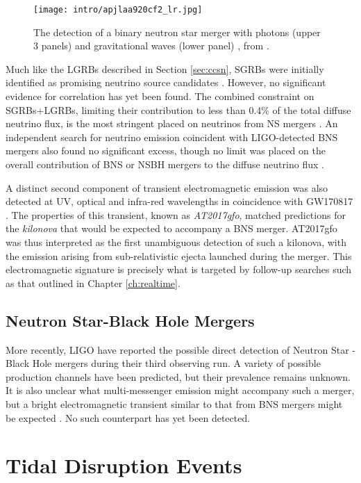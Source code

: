 \begin{figure}[!ht]
	\centering \texttt{[image: intro/apjlaa920cf2\_lr.jpg]}
	\caption{The detection of a binary neutron star merger with photons (upper 3 panels) and gravitational waves (lower panel) , from \cite{grb170817}.}
	\label{fig:gw170817}
\end{figure}

Much like the LGRBs described in Section \ref{sec:ccsn}, SGRBs were initially identified as promising neutrino source candidates \cite{waxman_bahcall_97_grb}. However, no significant evidence for correlation has yet been found. The combined constraint on SGRBs+LGRBs, limiting their contribution to less than 0.4\% of the total diffuse neutrino flux, is the most stringent placed on neutrinos from NS mergers \cite{ic_grb_17}. An independent search for neutrino emission coincident with LIGO-detected BNS mergers also found no significant excess, though no limit was placed on the overall contribution of BNS or NSBH mergers to the diffuse neutrino flux .

A distinct second component of transient electromagnetic emission was also detected at UV, optical and infra-red wavelengths in coincidence with GW170817 \cite{gw170817_mm}. The properties of this transient, known as \emph{AT2017gfo}, matched predictions for the \emph{kilonova} that would be expected to accompany a BNS merger. AT2017gfo was thus interpreted as the first unambiguous detection of such a kilonova, with the emission arising from sub-relativistic ejecta launched during the merger. This electromagnetic signature is precisely what is targeted by follow-up searches such as that outlined in Chapter \ref{ch:realtime}.

\subsection*{Neutron Star-Black Hole Mergers}

More recently, LIGO have reported the possible direct detection of Neutron Star - Black Hole mergers during their third observing run. A variety of possible production channels have been predicted, but their prevalence remains unknown. It is also unclear what multi-messenger emission might accompany such a merger, but a bright electromagnetic transient similar to that from BNS mergers might be expected . No such counterpart has yet been detected.


\section{Tidal Disruption Events}
\label{sec:tde}

